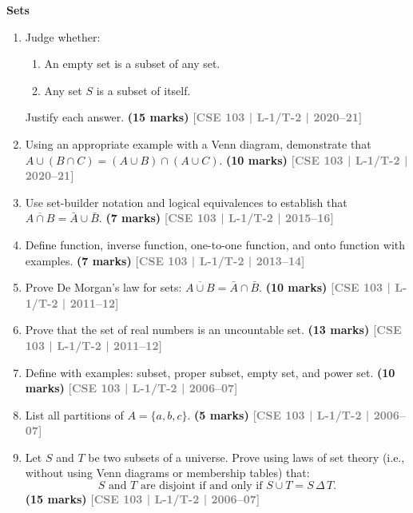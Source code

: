 \documentclass[12pt,a3paper]{article}
\newcommand{\yr}[1]{\hfill\textcolor{gray}{\small\textbf{[#1]}}}
\newcommand{\mk}[1]{\textcolor{orange!70!black}{\small\textbf{(#1 marks)}}}
\newcommand{\subtopic}[2]{%
  \vspace{10pt}
  \noindent\begin{tcolorbox}[colback=#1!8,colframe=#1,boxrule=0.6pt,arc=4pt,
    left=6pt,right=6pt,top=4pt,bottom=4pt]
    \small\bfseries\textcolor{#1}{#2}
  \end{tcolorbox}
  \vspace{2pt}
}
\begin{document}
\subtopic{cB}{Sets}
\label{sub:s3-sets}

\begin{enumerate}


\item Judge whether:
\begin{enumerate}
  \item An empty set is a subset of any set.
  \item Any set $S$ is a subset of itself.
\end{enumerate}
Justify each answer.
\mk{15} \yr{CSE 103 | L-1/T-2 | 2020--21}

\item Using an appropriate example with a Venn diagram, demonstrate that $A \cup (B \cap C) = (A \cup B) \cap (A \cup C)$.
\mk{10} \yr{CSE 103 | L-1/T-2 | 2020--21}

\item Use set-builder notation and logical equivalences to establish that $\overline{A \cap B} = \bar{A} \cup \bar{B}$.
\mk{7} \yr{CSE 103 | L-1/T-2 | 2015--16} 

\item Define function, inverse function, one-to-one function, and onto function with examples.
\mk{7} \yr{CSE 103 | L-1/T-2 | 2013--14} 


\item Prove De Morgan's law for sets: $\overline{A \cup B} = \bar{A} \cap \bar{B}$.
\mk{10} \yr{CSE 103 | L-1/T-2 | 2011--12}

\item Prove that the set of real numbers is an uncountable set.
\mk{13} \yr{CSE 103 | L-1/T-2 | 2011--12}


\item Define with examples: subset, proper subset, empty set, and power set.
\mk{10} \yr{CSE 103 | L-1/T-2 | 2006--07}

\item List all partitions of $A = \{a, b, c\}$.
\mk{5} \yr{CSE 103 | L-1/T-2 | 2006--07}

\item Let $S$ and $T$ be two subsets of a universe. Prove using laws of set theory (i.e., without using Venn diagrams or membership tables) that:
\[
  S \text{ and } T \text{ are disjoint if and only if } S \cup T = S \,\Delta\, T.
\]
\mk{15} \yr{CSE 103 | L-1/T-2 | 2006--07}

\end{enumerate}
\end{document}
